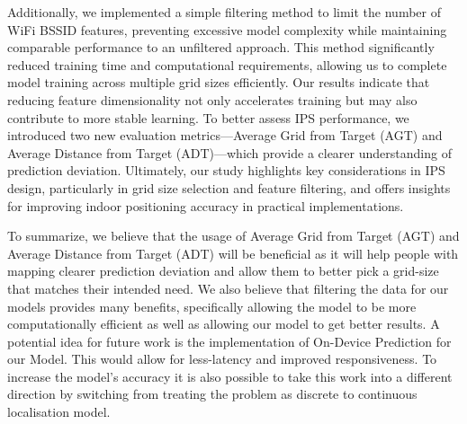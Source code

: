 \documentclass[runningheads]{llncs}
\begin{document}
Additionally, we implemented a simple filtering method to limit the number of WiFi BSSID features, preventing excessive model complexity while maintaining comparable performance to an unfiltered approach. This method significantly reduced training time and computational requirements, allowing us to complete model training across multiple grid sizes efficiently. Our results indicate that reducing feature dimensionality not only accelerates training but may also contribute to more stable learning. To better assess IPS performance, we introduced two new evaluation metrics—Average Grid from Target (AGT) and Average Distance from Target (ADT)—which provide a clearer understanding of prediction deviation. Ultimately, our study highlights key considerations in IPS design, particularly in grid size selection and feature filtering, and offers insights for improving indoor positioning accuracy in practical implementations.

To summarize, we believe that the usage of Average Grid from Target (AGT)
and Average Distance from Target (ADT) will be beneficial as it will help people with mapping clearer prediction deviation and allow them to better pick a grid-size that matches their intended need. We also believe that filtering the data for our models provides many benefits, specifically allowing the model to be more computationally efficient as well as allowing our model to get better results. A potential idea for future work is the implementation of On-Device Prediction for our Model. This would allow for less-latency and improved responsiveness. To increase the model’s accuracy it is also possible to take this work into a different direction by switching from treating the problem as discrete to continuous localisation model.

\nocite{bgp4, add2, add3, add4}


\end{document}
